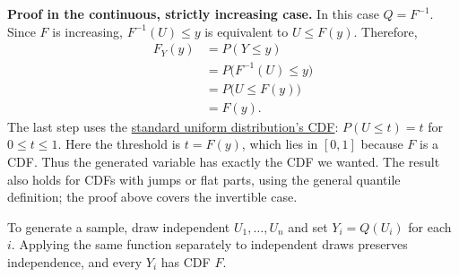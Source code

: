 \documentclass[a4paper,12pt,oneside]{report}
\begin{document}
\textbf{Proof in the continuous, strictly increasing case.}
In this case $Q=F^{-1}$. Since $F$ is increasing,
$F^{-1}(U)\leq y$ is equivalent to $U\leq F(y)$. Therefore,
\begin{align*}
  F_Y(y)&=P(Y\leq y)\\
        &=P\bigl(F^{-1}(U)\leq y\bigr)\\
        &=P\bigl(U\leq F(y)\bigr)\\
        &=F(y).
\end{align*}
The last step uses the
\hyperref[sec:uniform-standard]{standard uniform distribution's CDF}:
$P(U\leq t)=t$ for $0\leq t\leq1$. Here the threshold is
$t=F(y)$, which lies in $[0,1]$ because $F$ is a CDF.
Thus the generated variable has exactly the CDF we wanted.
The result also holds for CDFs with jumps or flat parts, using the
general quantile definition; the proof above covers the invertible
case.

To generate a sample, draw independent $U_1,\ldots,U_n$ and set
$Y_i=Q(U_i)$ for each $i$. Applying the same function separately
to independent draws preserves independence, and every $Y_i$ has
CDF $F$.

\clearpage
\end{document}
